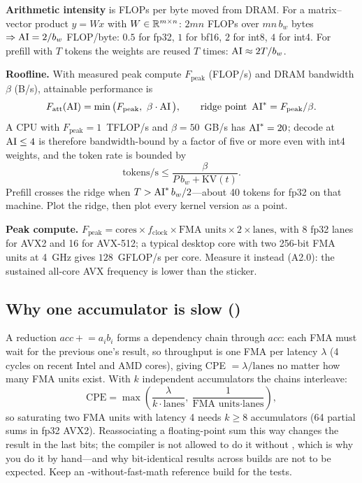 \textbf{Arithmetic intensity} is FLOPs per byte moved from DRAM. For a matrix--vector product $y = Wx$ with $W\in\mathbb{R}^{m\times n}$: $2mn$ FLOPs over $mn\,b_w$ bytes $\Rightarrow \operatorname{AI} = 2/b_w$ FLOP/byte: $0.5$ for fp32, $1$ for bf16, $2$ for int8, $4$ for int4. For prefill with $T$ tokens the weights are reused $T$ times: $\operatorname{AI} \approx 2T/b_w$.

\textbf{Roofline.} With measured peak compute $F_{\text{peak}}$ (FLOP/s) and DRAM bandwidth $\beta$ (B/s), attainable performance is
\begin{equation}
F_{\text{att}}(\AI) = \min\big(F_{\text{peak}},\ \beta\cdot\AI\big),\qquad \text{ridge point } \AI^\ast = F_{\text{peak}}/\beta .
\end{equation}
A CPU with $F_{\text{peak}} = 1$~TFLOP/s and $\beta = 50$~GB/s has $\operatorname{AI}^\ast = 20$; decode at $\operatorname{AI}\le 4$ is therefore bandwidth-bound by a factor of five or more even with int4 weights, and the token rate is bounded by
\begin{equation}
\text{tokens/s} \le \frac{\beta}{P\,b_w + \text{KV}(t)} .
\end{equation}
Prefill crosses the ridge when $T > \operatorname{AI}^\ast b_w/2$---about 40 tokens for fp32 on that machine. Plot the ridge, then plot every kernel version as a point.

\textbf{Peak compute.} $F_{\text{peak}} = \text{cores}\times f_{\text{clock}}\times \text{FMA units}\times 2\times \text{lanes}$, with 8 fp32 lanes for AVX2 and 16 for AVX-512; a typical desktop core with two 256-bit FMA units at 4~GHz gives $128$~GFLOP/s per core. Measure it instead (A2.0): the sustained all-core AVX frequency is lower than the sticker.

\subsection{Why one accumulator is slow ()}

A reduction $\mathit{acc} \mathrel{+}= a_i b_i$ forms a dependency chain through $\mathit{acc}$: each FMA must wait for the previous one's result, so throughput is one FMA per latency $\lambda$ (4 cycles on recent Intel and AMD cores), giving CPE $=\lambda/\text{lanes}$ no matter how many FMA units exist. With $k$ independent accumulators the chains interleave:
\begin{equation}
\text{CPE} = \max\!\left(\frac{\lambda}{k\cdot\text{lanes}},\ \frac{1}{\text{FMA units}\cdot\text{lanes}}\right),
\end{equation}
so saturating two FMA units with latency 4 needs $k\ge 8$ accumulators (64 partial sums in fp32 AVX2). Reassociating a floating-point sum this way changes the result in the last bits; the compiler is not allowed to do it without , which is why you do it by hand---and why bit-identical results across builds are not to be expected. Keep an -without-fast-math reference build for the tests.

